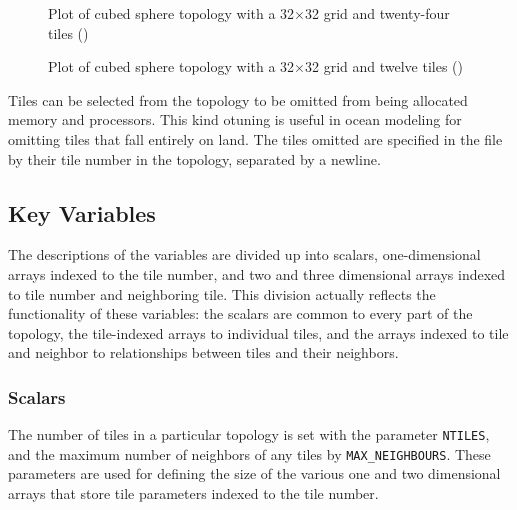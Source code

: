 \begin{figure}
\begin{center}
\end{center} 
\caption{Plot of cubed sphere topology with a 32$\times$32 grid and
twenty-four tiles ()
} \label{fig:24tile}
\end{figure}

\begin{figure}
\begin{center}
\end{center} 
\caption{Plot of cubed sphere topology with a 32$\times$32 grid and
twelve tiles ()
} \label{fig:12tile}
\end{figure}

Tiles can be selected from the topology to be omitted from being
allocated memory and processors.  This kind otuning is useful in
ocean modeling for omitting tiles that fall entirely on land.  The
tiles omitted are specified in the file  by
their tile number in the topology, separated by a newline. \\






\subsection{Key Variables}

The descriptions of the variables are divided up into scalars,
one-dimensional arrays indexed to the tile number, and two and three
dimensional arrays indexed to tile number and neighboring tile.  This
division actually reflects the functionality of these variables: the
scalars are common to every part of the topology, the tile-indexed
arrays to individual tiles, and the arrays indexed to tile and
neighbor to relationships between tiles and their neighbors.

\subsubsection{Scalars}

The number of tiles in a particular topology is set with the parameter
\texttt{NTILES}, and the maximum number of neighbors of any tiles by
\texttt{MAX\_NEIGHBOURS}.  These parameters are used for defining the
size of the various one and two dimensional arrays that store tile
parameters indexed to the tile number.\\

